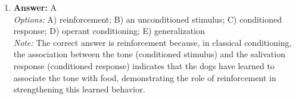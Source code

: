 \documentclass[12pt]{article}
\begin{document}
\begin{enumerate}[label=\arabic*.]
\\ \textit{Note:} Investing in more modern educational technology can enhance instructional methods and provide personalized learning experiences, thereby addressing the identified gaps in student performance and helping to meet school competencies.
\item \textbf{Answer:} A
\\ \textit{Options:} A) reinforcement; B) an unconditioned stimulus; C) conditioned response; D) operant conditioning; E) generalization
\\ \textit{Note:} The correct answer is reinforcement because, in classical conditioning, the association between the tone (conditioned stimulus) and the salivation response (conditioned response) indicates that the dogs have learned to associate the tone with food, demonstrating the role of reinforcement in strengthening this learned behavior.
\end{enumerate}
\end{document}
